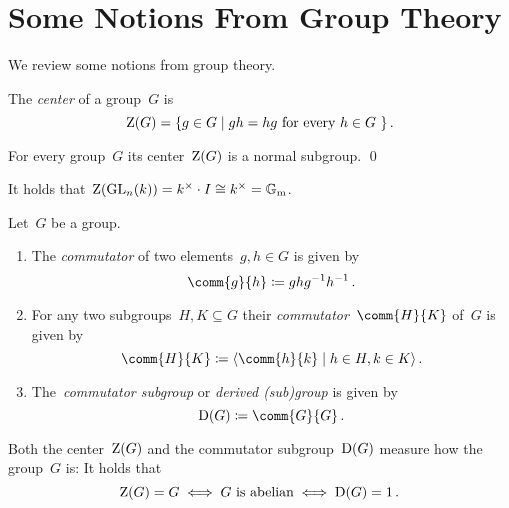 \section{Some Notions From Group Theory}


\begin{fluff}
  We review some notions from group theory.
\end{fluff}


\begin{definition}
  The \emph{center} of a group~$G$ is
  \[
      \groupcenter(G)
    = \{
        g \in G
      \suchthat
        \text{$gh = hg$ for every~$h \in G$}\ 
      \} \,.
  \]
\end{definition}


\begin{lemma}
  For every group~$G$ its center~$\operatorname{Z}(G)$ is a normal subgroup.
  \qed
\end{lemma}


\begin{example}
  It holds that~$\operatorname{Z}(\operatorname{GL}_n(k)) = k^\times \cdot I \cong k^\times = \mathbb{G}_{\text{m}}$.
\end{example}


\begin{definition}
  Let~$G$ be a group.
  \begin{enumerate}
    \item
      The \emph{commutator} of two elements~$g, h \in G$ is given by
      \[
                  \comm{g}{h}
        \defined  g h g^{-1} h^{-1} \,.
      \]
    \item
      For any two subgroups~$H, K \subseteq G$ their \emph{commutator}~$\comm{H}{K}$ of~$G$ is given by
      \[
                  \comm{H}{K}
        \defined  \gen{ \comm{h}{k} \suchthat h \in H, k \in K } \,.
      \]
    \item
      The~\emph{commutator subgroup} or \emph{derived \textup(sub\textup)group} is given by
      \[
                  \Derived(G)
        \defined  \comm{G}{G} \,.
      \]
  \end{enumerate}
\end{definition}


\begin{fluff}
  Both the center~$\operatorname{Z}(G)$ and the commutator subgroup~$\operatorname{D}(G)$ measure how  the group~$G$ is:
  It holds that
  \[
          \operatorname{Z}(G) = G
    \iff  \text{$G$ is abelian}
    \iff  \operatorname{D}(G) = 1 \,.
  \]
\end{fluff}



